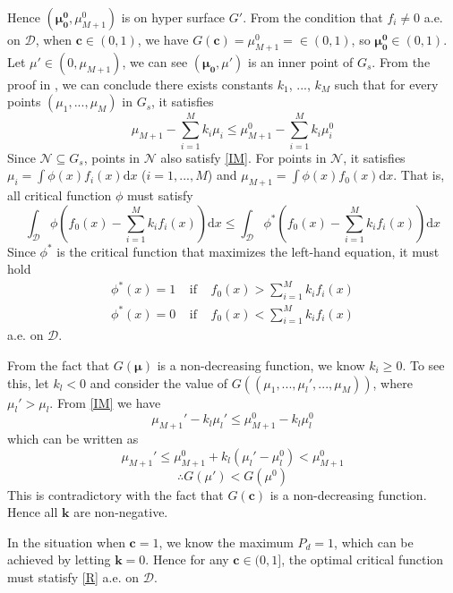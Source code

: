 \documentclass[12pt,journal,a4paper,twoside,onecolumn]{IEEEtran}
\begin{document}
\begin{spacing}{2.5}
Hence $(\mathbf{\mu^0_0}, \mu_{M+1}^0)$ is on hyper surface $G'$. From the condition that $f_i \neq 0$ a.e. on $\mathcal{D}$, when $\mathbf{c} \in (0, 1)$, we have $G(\mathbf{c}) = \mu_{M+1}^0 = \in (0, 1)$, so $\mathbf{\mu_0^0} \in (0, 1)$. Let $\mu' \in (0, \mu_{M+1})$, we can see $(\mathbf{\mu_0}, \mu')$ is an inner point of $G_s$. From the proof in \cite{LehmannTest}, we can conclude there exists constants $k_1$, ..., $k_M$  such that for every points $(\mu_1, ..., \mu_M)$ in $G_s$, it satisfies
\begin{equation}
\label{IM}
\mu_{M+1} - \sum_{i=1}^{M}k_i\mu_i \leq \mu_{M+1}^0 - \sum_{i=1}^{M}k_i\mu_i^0
\end{equation}
Since $\mathcal{N} \subseteq G_s$,  points in $\mathcal{N}$ also satisfy \eqref{IM}. For points in $\mathcal{N}$, it satisfies $\mu_i = \int\phi(x) f_i(x)\mathrm{d}x$ ($i=1, ..., M$) and $\mu_{M+1} = \int \phi(x) f_0(x)\mathrm{d}x$. That is, all critical function $\phi$ must satisfy
\begin{equation}
\label{IMP}
\int_{\mathcal{D}}\phi(f_{0}(x) - \sum_{i=1}^{M}k_if_i(x))\mathrm{d}x \leq \int_{\mathcal{D}}\phi^\ast(f_{0}(x) - \sum_{i=1}^{M}k_if_i(x))\mathrm{d}x 
\end{equation}
Since $\phi^\ast$ is the critical function that maximizes the left-hand equation, it must hold 
\begin{equation}
\begin{split}
\label{R}
\phi^\ast(x)= 1\;\;\;\;\text{if}\;\;\;\;f_0(x) > \sum_{i=1}^{M}k_if_i(x)\\
\phi^\ast(x)= 0\;\;\;\;\text{if}\;\;\;\;f_0(x) < \sum_{i=1}^{M}k_if_i(x)
\end{split}
\end{equation}
a.e. on $\mathcal{D}$.

From the fact that $G(\mathbf{\mu})$ is a non-decreasing function, we know $k_i \geq 0$. To see this, let $k_l < 0$ and consider the value of $G((\mu_1,..., \mu_l', ..., \mu_M))$, where $\mu_l' > \mu_l$.  From \eqref{IM} we have 
\[
\mu_{M+1}' - k_l\mu_l' \leq \mu_{M+1}^0 - k_l\mu_l^0
\]
which can be written as
\[
\mu_{M+1}' \leq \mu_{M+1}^0 + k_l(\mu_l' - \mu_l^0) < \mu_{M+1}^0
\]
\[
\therefore G(\mu') < G(\mu^0)
\]
This is contradictory with the fact that $G(\mathbf{c})$ is a non-decreasing function. Hence all $\mathbf{k}$ are non-negative.

In the situation when $\mathbf{c} = 1$, we know the maximum $P_d = 1$, which can be achieved by letting $\mathbf{k}=0$. 
Hence for any $\mathbf{c} \in (0, 1]$, the optimal critical function must statisfy \eqref{R} a.e. on $\mathcal{D}$.


\end{spacing}
\end{document}
